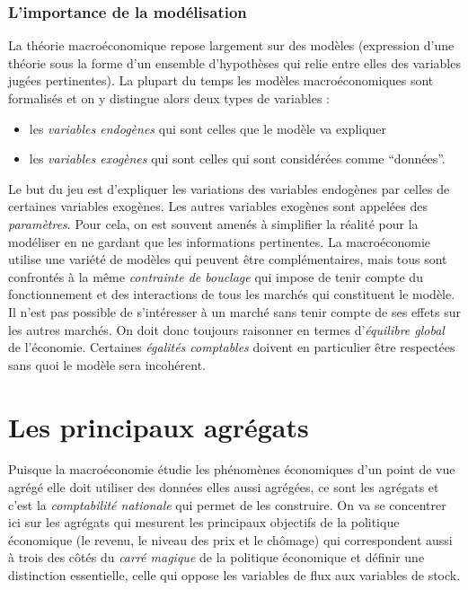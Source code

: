 \documentclass[10pt]{book}
\begin{document}
\subsubsection{L'importance de la modélisation}
La théorie macroéconomique repose largement sur des modèles (expression d'une théorie sous la forme d'un ensemble d'hypothèses qui relie entre elles des variables jugées pertinentes). La plupart du temps les modèles macroéconomiques sont formalisés et on y distingue alors deux types de variables : 
\begin{itemize}
  \item les \textit{variables endogènes} qui sont celles que le modèle va expliquer
  \item les \textit{variables exogènes} qui sont celles qui sont considérées comme ``données''.
\end{itemize}
Le but du jeu est d'expliquer les variations des variables endogènes par celles de certaines variables exogènes. Les autres variables exogènes sont appelées des \textit{paramètres}. Pour cela, on est souvent amenés à simplifier la réalité pour la modéliser en ne gardant que les informations pertinentes. La macroéconomie utilise une variété de modèles qui peuvent être complémentaires, mais tous sont confrontés à la même \textit{contrainte de bouclage} qui impose de tenir compte du fonctionnement et des interactions de tous les marchés qui constituent le modèle. Il n'est pas possible de s'intéresser à un marché sans tenir compte de ses effets sur les autres marchés. On doit donc toujours raisonner en termes d'\textit{équilibre global} de l'économie. Certaines \textit{égalités comptables} doivent en particulier être respectées sans quoi le modèle sera incohérent.

\section{Les principaux agrégats}
Puisque la macroéconomie étudie les phénomènes économiques d'un point de vue agrégé elle doit utiliser des données elles aussi agrégées, ce sont les agrégats et c'est la \textit{comptabilité nationale} qui permet de les construire. On va se concentrer ici sur les agrégats qui mesurent les principaux objectifs de la politique économique (le  revenu, le niveau des prix et le chômage) qui correspondent aussi à trois des côtés du \textit{carré magique} de la politique économique et définir une distinction essentielle, celle qui oppose les variables de flux aux variables de stock.
\end{document}
